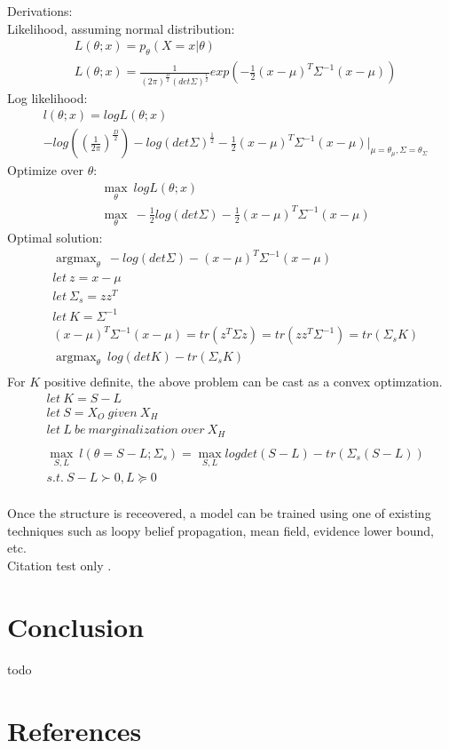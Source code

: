\documentclass[10pt,conference]{IEEEtran}
\DeclareMathOperator*{\argmax}{argmax}
\begin{document}
Derivations:\\
Likelihood, assuming normal distribution:
\begin{align*}
  &L(\theta;x) = p_{\theta}(X=x | \theta)\\
  &L(\theta;x) = \frac{1}{(2\pi)^{\frac{D}{2}} (det \Sigma)^{\frac{1}{2}}} exp(-\frac{1}{2}(x-\mu)^T\Sigma^{-1}(x-\mu))
\end{align*}
Log likelihood:
\begin{align*}
  & l(\theta;x) = log L(\theta;x)\\
  & -log((\frac{1}{2 \pi})^{\frac{D}{2}}) - log(det \Sigma)^{\frac{1}{2}} - \frac{1}{2}(x-\mu)^T \Sigma^{-1}(x-\mu) \bigg|_{\mu=\theta_{\mu}, \Sigma=\theta_{\Sigma}}
\end{align*}
Optimize over $\theta$:
\begin{align*}
  & \max_{\theta}\ log L(\theta;x)\\
  & \max_{\theta}\ - \frac{1}{2} log(det \Sigma) - \frac{1}{2}(x-\mu)^T \Sigma^{-1}(x-\mu)
\end{align*}
Optimal solution:
\begin{align*}
  & \argmax_{\theta}\ -log(det \Sigma) - (x-\mu)^T \Sigma^{-1}(x-\mu)\\
  &let\ z= x-\mu\\
  &let\ \Sigma_{s}= zz^T\\
  &let\ K = \Sigma^{-1}\\
  &(x-\mu)^T \Sigma^{-1}(x-\mu) = tr(z^T \Sigma z) = tr(zz^T \Sigma^{-1}) = tr(\Sigma_{s} K)\\
  & \argmax_{\theta}\ log(det K) - tr(\Sigma_{s} K)\\
\end{align*}
For $K$ positive definite, the above problem can be cast as a convex optimzation.
\begin{align*}
  &let\ K=S-L\\
  &let\ S = X_O\ given\ X_H\\
  &let\ L\ be\ marginalization\ over\ X_H\\
  \\
  &\max_{S,L}\ l(\theta=S-L; \Sigma_{s}) = \max_{S,L} log det(S-L) - tr(\Sigma_{s}(S-L))\\
  &s.t.\ S-L \succ 0, L \succeq 0\\
\end{align*}

\vfill\null

\pagebreak

Once the structure is receovered, a model can be trained using one of existing techniques such as loopy belief propagation, mean field, evidence lower bound, etc.\\

Citation test only \cite{Chandra_1}.

\vfill\null

\pagebreak

\section*{Conclusion}
todo
\vfill\null

\pagebreak

\section*{References}
\printbibliography[heading=none]
\end{document}

